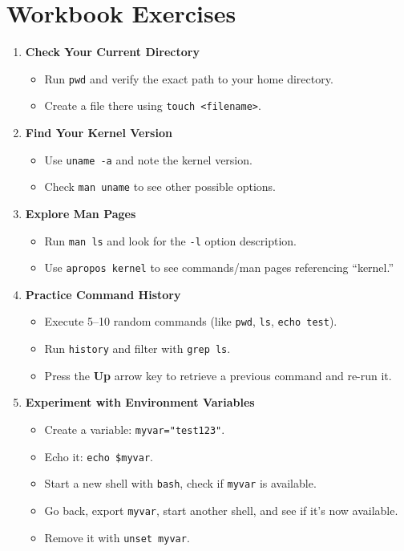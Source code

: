 \documentclass[a4paper]{report}
\begin{document}
\section*{Workbook Exercises}
\begin{enumerate}
    \item \textbf{Check Your Current Directory}
    \begin{itemize}
        \item Run \texttt{pwd} and verify the exact path to your home directory.
        \item Create a file there using \texttt{touch <filename>}.
    \end{itemize}

    \item \textbf{Find Your Kernel Version}
    \begin{itemize}
        \item Use \texttt{uname -a} and note the kernel version.
        \item Check \texttt{man uname} to see other possible options.
    \end{itemize}

    \item \textbf{Explore Man Pages}
    \begin{itemize}
        \item Run \texttt{man ls} and look for the \texttt{-l} option description.
        \item Use \texttt{apropos kernel} to see commands/man pages referencing “kernel.”
    \end{itemize}

    \item \textbf{Practice Command History}
    \begin{itemize}
        \item Execute 5–10 random commands (like \texttt{pwd}, \texttt{ls}, \texttt{echo test}).
        \item Run \texttt{history} and filter with \texttt{grep ls}.
        \item Press the \textbf{Up} arrow key to retrieve a previous command and re-run it.
    \end{itemize}

    \item \textbf{Experiment with Environment Variables}
    \begin{itemize}
        \item Create a variable: \texttt{myvar="test123"}.
        \item Echo it: \texttt{echo \$myvar}.
        \item Start a new shell with \texttt{bash}, check if \texttt{myvar} is available.
        \item Go back, export \texttt{myvar}, start another shell, and see if it’s now available.
        \item Remove it with \texttt{unset myvar}.
    \end{itemize}


\end{enumerate}
\end{document}
